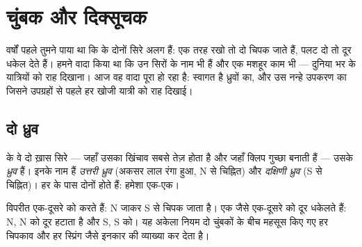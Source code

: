 \chapter{चुंबक और दिक्सूचक}\label{ch:g4:magnets-and-compass}

वर्षों पहले तुमने पाया था कि  के दोनों सिरे अलग हैं: एक तरह रखो
तो दो  चिपक जाते हैं, पलट दो तो दूर धकेल देते हैं। हमने वादा किया
था कि उन सिरों के नाम भी हैं और एक मशहूर काम भी --- दुनिया भर के
यात्रियों को राह दिखाना। आज वह वादा पूरा हो रहा है: स्वागत है ध्रुवों
का, और उस नन्हे उपकरण का जिसने उपग्रहों से पहले हर खोजी यात्री को राह
दिखाई।

\section{दो ध्रुव}

\begin{definition}[ध्रुव]\label{def:g4:magnets-and-compass:poles}
 के वे दो ख़ास सिरे --- जहाँ उसका खिंचाव सबसे तेज़ होता है और
जहाँ क्लिप गुच्छा बनाती हैं --- उसके \emph{ध्रुव} हैं।
इनके नाम हैं \emph{उत्तरी ध्रुव} (अकसर लाल रंगा
हुआ, N से चिह्नित) और \emph{दक्षिणी ध्रुव} (S से
चिह्नित)। हर  के पास दोनों होते हैं: हमेशा एक-एक।
\end{definition}

\begin{proposition}[ध्रुवों का नियम]\label{prop:g4:magnets-and-compass:rule}
विपरीत  एक-दूसरे को  करते हैं: N जाकर S से चिपक जाता है।
एक जैसे  एक-दूसरे को दूर धकेलते हैं: N, N को दूर हटाता है और S,
S को। यह अकेला नियम दो चुंबकों के बीच महसूस किए गए हर चिपकाव और हर
स्प्रिंग जैसे इनकार की व्याख्या कर देता है।
\end{proposition}

